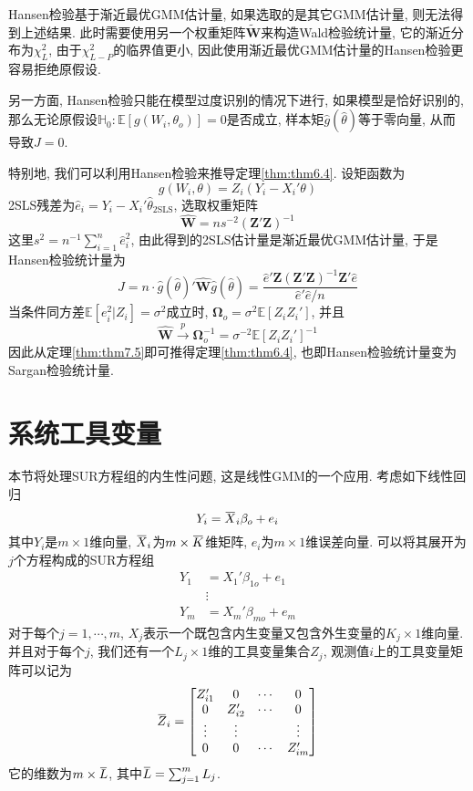 \documentclass[cn, 12pt, math=mtpro2, bibstyle=apa, blue, twocol]{elegantbook}
\newcommand{\E}{\mathbb{E}}
\newcommand{\W}{\mathbold{W}}
\newcommand{\Z}{\mathbold{Z}}
\newcommand{\HH}{\mathbb{H}}
\newcommand{\OX}{\overbar{X}}
\newcommand{\BO}{\mathbold{\Omega}}
\newcommand{\overbar}[1]{\mkern 1.5mu\overline{\mkern-1.5mu#1\mkern-1.5mu}\mkern 1.5mu}
\begin{document}
Hansen检验基于渐近最优GMM估计量, 如果选取的是其它GMM估计量, 则无法得到上述结果. 此时需要使用另一个权重矩阵$\tilde{\W}$来构造Wald检验统计量, 它的渐近分布为$\chi_L^2$, 由于$\chi^2_{L-P}$的临界值更小, 因此使用渐近最优GMM估计量的Hansen检验更容易拒绝原假设.

另一方面, Hansen检验只能在模型过度识别的情况下进行, 如果模型是恰好识别的, 那么无论原假设$\HH_0:\E[g(W_i,\theta_o)]=0$是否成立, 样本矩$\hat{g}(\hat{\theta})$等于零向量, 从而导致$J=0$.

特别地, 我们可以利用Hansen检验来推导定理\ref{thm:thm6.4}. 设矩函数为
$$g(W_i,\theta)=Z_i(Y_i-X_i'\theta)$$
2SLS残差为$\hat{e}_i=Y_i-X_i'\hat{\theta}_{\text{2SLS}}$, 选取权重矩阵
$$\hat{\W}=ns^{-2}(\Z'\Z)^{-1}$$
这里$s^2=n^{-1}\sum_{i=1}^{n}\hat{e}_i^2$, 由此得到的2SLS估计量是渐近最优GMM估计量, 于是Hansen检验统计量为
$$J=n\cdot\hat{g}(\hat{\theta})'\hat{\W}\hat{g}(\hat{\theta})=\frac{\hat{e}'\Z(\Z'\Z)^{-1}\Z'\hat{e}}{\hat{e}'\hat{e}/n}$$
当条件同方差$\E[e_i^2|Z_i]=\sigma^2$成立时, $\BO_o=\sigma^2\E[Z_iZ_i']$, 并且$$\hat{\W}\xrightarrow{p}\BO_o^{-1}=\sigma^{-2}\E[Z_iZ_i']^{-1}$$
因此从定理\ref{thm:thm7.5}即可推得定理\ref{thm:thm6.4}, 也即Hansen检验统计量变为Sargan检验统计量.

\section{系统工具变量}
本节将处理SUR方程组的内生性问题, 这是线性GMM的一个应用. 考虑如下线性回归
\begin{equation}\label{eq7.11}
  Y_i=\overbar{X}_i\beta_o+e_i
\end{equation}
其中$Y_i$是$m\times 1$维向量, $\OX_i$为$m\times \overbar{K}$维矩阵, $e_i$为$m\times1$维误差向量. 可以将其展开为$j$个方程构成的SUR方程组
\begin{align*}
Y_1&=X_1'\beta_{1o}+e_1 \\
&\vdots \\
Y_m&=X_m'\beta_{mo}+e_m
\end{align*}
对于每个$j=1,\cdots,m$, $X_j$表示一个既包含内生变量又包含外生变量的$K_j\times1$维向量. 并且对于每个$j$, 我们还有一个$L_j\times1$维的工具变量集合$Z_j$, 观测值$i$上的工具变量矩阵可以记为
$$\overbar{Z}_i=\begin{bmatrix}
                   Z_{i1}' & 0 & \cdots & 0 \\
                   0 & Z_{i2}' & \cdots & 0 \\
                   \vdots & \vdots &  & \vdots \\
                   0 & 0 & \cdots & Z_{im}'
                 \end{bmatrix}$$
它的维数为$m\times\overbar{L}$, 其中$\overbar{L}=\sum_{j=1}^{m}L_j$.
\end{document}
